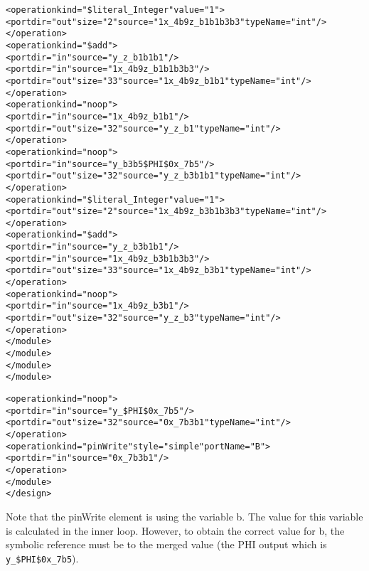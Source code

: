 \begin{alltt}
            <operation kind="\$literal\_Integer" value="1">
              <port dir="out" size="2" source="1x\_4b9z\_b1b1b3b3" typeName="int"/>
            </operation>
            <operation kind="\$add">
              <port dir="in" source="y\_z\_b1b1b1"/>
              <port dir="in" source="1x\_4b9z\_b1b1b3b3"/>
              <port dir="out" size="33" source="1x\_4b9z\_b1b1" typeName="int"/>
            </operation>
            <operation kind="noop">
              <port dir="in" source="1x\_4b9z\_b1b1"/>
              <port dir="out" size="32" source="y\_z\_b1" typeName="int"/>
            </operation>
            <operation kind="noop">
              <port dir="in" source="y\_b3b5\$PHI\$0x\_7b5"/>
              <port dir="out" size="32" source="y\_z\_b3b1b1" typeName="int"/>
            </operation>
            <operation kind="\$literal\_Integer" value="1">
              <port dir="out" size="2" source="1x\_4b9z\_b3b1b3b3" typeName="int"/>
            </operation>
            <operation kind="\$add">
              <port dir="in" source="y\_z\_b3b1b1"/>
              <port dir="in" source="1x\_4b9z\_b3b1b3b3"/>
              <port dir="out" size="33" source="1x\_4b9z\_b3b1" typeName="int"/>
            </operation>
            <operation kind="noop">
              <port dir="in" source="1x\_4b9z\_b3b1"/>
              <port dir="out" size="32" source="y\_z\_b3" typeName="int"/>
            </operation>
          </module>
        </module>
      </module>
    </module>
    
    <operation kind="noop">
      <port dir="in" source="y\_\$PHI\$0x\_7b5"/>
      <port dir="out" size="32" source="0x\_7b3b1" typeName="int"/>
    </operation>
    <operation kind="pinWrite" style="simple" portName="B">
      <port dir="in" source="0x\_7b3b1"/>
    </operation>
  </module>
</design>
\end{alltt}

Note that the pinWrite element is using the variable b.  The value for
this variable is calculated in the inner loop.  However, to obtain the
correct value for b, the symbolic reference must be to the merged
value (the PHI output which is {\tt y\_\$PHI\$0x\_7b5}).


